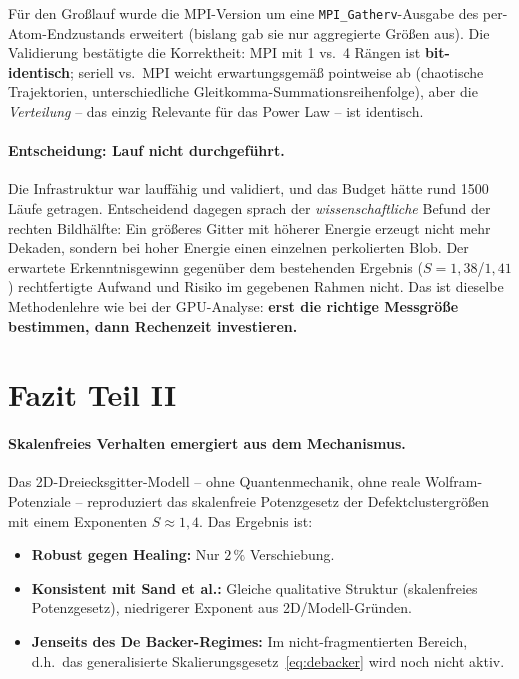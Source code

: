 \documentclass[11pt,a4paper]{article}
\begin{document}
Für den Großlauf wurde die MPI-Version um eine \texttt{MPI\_Gatherv}-Ausgabe
des per-Atom-Endzustands erweitert (bislang gab sie nur aggregierte Größen aus).
Die Validierung bestätigte die Korrektheit: MPI mit 1 vs.\ 4 Rängen ist
\textbf{bit-identisch}; seriell vs.\ MPI weicht erwartungsgemäß pointweise ab
(chaotische Trajektorien, unterschiedliche Gleitkomma-Summationsreihenfolge),
aber die \emph{Verteilung} -- das einzig Relevante für das Power Law -- ist
identisch.

\paragraph{Entscheidung: Lauf nicht durchgeführt.}
Die Infrastruktur war lauffähig und validiert, und das Budget hätte rund 1500
Läufe getragen. Entscheidend dagegen sprach der \emph{wissenschaftliche} Befund
der rechten Bildhälfte: Ein größeres Gitter mit höherer Energie erzeugt nicht
mehr Dekaden, sondern bei hoher Energie einen einzelnen perkolierten Blob. Der
erwartete Erkenntnisgewinn gegenüber dem bestehenden Ergebnis
($S = 1{,}38$/$1{,}41$) rechtfertigte Aufwand und Risiko im gegebenen Rahmen
nicht. Das ist dieselbe Methodenlehre wie bei der GPU-Analyse:
\textbf{erst die richtige Messgröße bestimmen, dann Rechenzeit investieren.}

\clearpage
\FloatBarrier
\section{Fazit Teil II}
\label{sec:fazit-powerlaw}

\paragraph{Skalenfreies Verhalten emergiert aus dem Mechanismus.}
Das 2D-Dreiecks\-gitter-Modell -- ohne Quantenmechanik, ohne reale
Wolfram-Potenziale -- reproduziert das skalenfreie Potenzgesetz der
Defektclustergrößen mit einem Exponenten $S \approx 1{,}4$.
Das Ergebnis ist:
\begin{itemize}[itemsep=2pt]
\item \textbf{Robust gegen Healing:} Nur $2\,\%$ Verschiebung.
\item \textbf{Konsistent mit Sand et al.:} Gleiche qualitative Struktur
  (skalenfreies Potenzgesetz), niedrigerer Exponent aus 2D/Modell-Gründen.
\item \textbf{Jenseits des De Backer-Regimes:} Im nicht-fragmentierten
  Bereich, d.h.\ das generalisierte Skalierungsgesetz~\eqref{eq:debacker}
  wird noch nicht aktiv.
\end{itemize}
\end{document}
